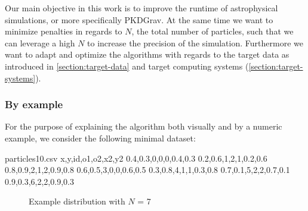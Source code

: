\documentclass[]{article}
\begin{document}
Our main objective in this work is to improve the runtime of astrophysical simulations, or more specifically PKDGrav. At the same time we want to minimize penalties in regards to $N$, the total number of particles, such that we can leverage a high $N$ to increase the precision of the simulation. Furthermore we want to adapt and optimize the algorithms with regards to the target data as introduced in \ref{section:target-data} and target computing systems (\ref{section:target-systems}).

\subsubsection{By example} 
For the purpose of explaining the algorithm both visually and by a numeric example, we consider the following minimal dataset:

\begin{filecontents*}{particles10.csv}
x,y,id,o1,o2,x2,y2
0.4,0.3,0,0,0,0.4,0.3
0.2,0.6,1,2,1,0.2,0.6
0.8,0.9,2,1,2,0.9,0.8
0.6,0.5,3,0,0,0.6,0.5
0.3,0.8,4,1,1,0.3,0.8
0.7,0.1,5,2,2,0.7,0.1
0.9,0.3,6,2,2,0.9,0.3
\end{filecontents*}

\begin{figure}[H]
    \begin{center}
        \begin{minipage}[c]{0.2\linewidth}
        \end{minipage}
        \begin{minipage}[c]{0.7\linewidth}
        \end{minipage}
    \end{center}
\caption{Example distribution with $N$ = 7}
\end{figure}
\end{document}

